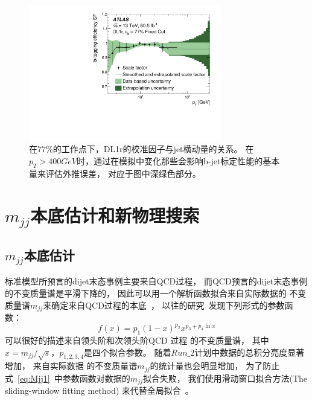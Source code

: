 \begin{figure}[thbp]
  \centering
  \includegraphics[width=0.75\textwidth]{figs/fig_01.pdf}
  \caption{ 
在$77\%$的工作点下，DL1r的校准因子与jet横动量的关系。
在$p_{T}>400GeV$时，通过在模拟中变化那些会影响b-jet标定性能的基本量来评估外推误差，
对应于图中深绿色部分。
    }
  \label{fig:SF}
\end{figure}




\section{$m_{jj}$本底估计和新物理搜索}
\label{sec:DijetMjj}


\subsection{$m_{jj}$本底估计}
\label{sec:DijetMjj1}

标准模型所预言的dijet末态事例主要来自QCD过程，
而QCD预言的dijet末态事例的不变质量谱是平滑下降的，
因此可以用一个解析函数拟合来自实际数据的
不变质量谱$m_{jj}$来确定来自QCD过程的本底~\cite{UA3}，
以往的研究~\cite{ATLASDijet1,ATLASDijet2,ATLASDijet5}发现下列形式的参数函数：
\begin{equation}
\label{eq:Mjj1}
f(x)=p_1(1-x)^{p_2}x^{p_3+p_4\ln x}
\end{equation}
可以很好的描述来自领头阶和次领头阶QCD
过程
的不变质量谱，
其中$x= m_{jj}/\sqrt{s}$，$p_{1,2,3,4}$是四个拟合参数。
随着$Run\_2$计划中数据的总积分亮度显著增加，
来自实际数据
的不变质量谱$m_{jj}$的统计量也会明显增加，
为了防止式~\ref{eq:Mjj1}~中参数函数对数据的$m_{jj}$拟合失败，
我们使用滑动窗口拟合方法(The sliding-window fitting method)
来代替全局拟合~\cite{ATLASDijet8}。

